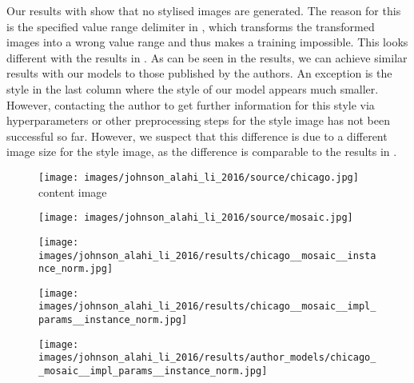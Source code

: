 Our results with \paper{} show that no stylised images are generated. The reason for this is the specified value range delimiter in \paper{}, which transforms the transformed images into a wrong value range and thus makes a training impossible. This looks different with the results in \implementation{}. As can be seen in the results, we can achieve similar results with our models to those published by the authors. An exception is the style in the last column where the style of our model appears much smaller. However, contacting the author to get further information for this style via hyperparameters or other preprocessing steps for the style image has not been successful so far. However, we suspect that this difference is due to a different image size for the style image, as the difference is comparable to the results in .
\begin{figure}[H]
	\centering
	\begin{minipage}[t]{0.24\textwidth}
		\centering
		\texttt{[image: images/johnson\_alahi\_li\_2016/source/chicago.jpg]}\\
		content image
	\end{minipage}
	\hfill%
	\begin{minipage}[t]{0.24\textwidth}
		\centering
		\hfill
	\end{minipage}
	\hfill%
	\begin{minipage}[t]{0.24\textwidth}
		\centering
		\hfill
	\end{minipage}
	\hfill%
	\begin{minipage}[t]{0.24\textwidth}
		\centering
		\hfill
	\end{minipage}
	\hfill%
	\begin{minipage}[t]{0.24\textwidth}
		\centering
		\texttt{[image: images/johnson\_alahi\_li\_2016/source/mosaic.jpg]}
	\end{minipage}
	\hfill%
	\begin{minipage}[t]{0.24\textwidth}
		\centering
		\texttt{[image: images/johnson\_alahi\_li\_2016/results/chicago\_\_mosaic\_\_instance\_norm.jpg]}
	\end{minipage}
	\hfill%
	\begin{minipage}[t]{0.24\textwidth}
		\centering
		\texttt{[image: images/johnson\_alahi\_li\_2016/results/chicago\_\_mosaic\_\_impl\_params\_\_instance\_norm.jpg]}
	\end{minipage}
	\hfill%
	\begin{minipage}[t]{0.24\textwidth}
		\centering
		\texttt{[image: images/johnson\_alahi\_li\_2016/results/author\_models/chicago\_\_mosaic\_\_impl\_params\_\_instance\_norm.jpg]}

\end{minipage}
\end{figure}
